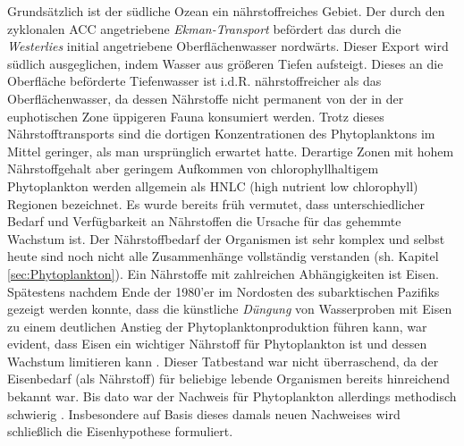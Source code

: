 \documentclass[12pt,a4paper,onecolumn]{scrartcl}
\begin{document}
Grundsätzlich ist der südliche Ozean ein nährstoffreiches Gebiet. Der durch den zyklonalen ACC angetriebene \textit{Ekman-Transport} befördert das durch die \textit{Westerlies} initial angetriebene Oberflächenwasser nordwärts. Dieser Export wird südlich ausgeglichen, indem Wasser aus größeren Tiefen aufsteigt. Dieses an die Oberfläche beförderte Tiefenwasser ist i.d.R. nährstoffreicher als das Oberflächenwasser, da dessen Nährstoffe nicht permanent von der in der euphotischen Zone üppigeren Fauna konsumiert werden. Trotz dieses Nährstofftransports sind die dortigen Konzentrationen des Phytoplanktons im Mittel geringer, als man ursprünglich erwartet hatte. Derartige Zonen mit hohem Nährstoffgehalt aber geringem Aufkommen von chlorophyllhaltigem Phytoplankton werden allgemein als HNLC (high nutrient low chlorophyll) Regionen bezeichnet. Es wurde bereits früh vermutet, dass unterschiedlicher Bedarf und Verfügbarkeit an Nährstoffen die Ursache für das gehemmte Wachstum ist. Der Nährstoffbedarf der Organismen ist sehr komplex und selbst heute sind noch nicht alle Zusammenhänge vollständig verstanden (sh. Kapitel \ref{sec:Phytoplankton}). Ein Nährstoffe mit zahlreichen Abhängigkeiten ist Eisen. Spätestens nachdem Ende der 1980'er im Nordosten des subarktischen Pazifiks gezeigt werden konnte, dass die künstliche \textit{Düngung} von Wasserproben mit Eisen zu einem deutlichen Anstieg der Phytoplanktonproduktion führen kann, war evident, dass Eisen ein wichtiger Nährstoff für Phytoplankton ist und dessen Wachstum limitieren kann \citep{Martin.1988}. Dieser Tatbestand war nicht überraschend, da der Eisenbedarf (als Nährstoff) für beliebige lebende Organismen bereits hinreichend bekannt war. Bis dato war der Nachweis für Phytoplankton allerdings methodisch schwierig \citep{Martin.1988}. Insbesondere auf Basis dieses damals neuen Nachweises wird schließlich die Eisenhypothese formuliert. \\
\end{document}

